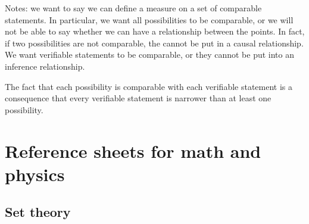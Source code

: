 \documentclass[11pt,letterpaper,fleqn]{memoir} %
\begin{document}
Notes: we want to say we can define a measure on a set of comparable statements. In particular, we want all possibilities to be comparable, or we will not be able to say whether we can have a relationship between the points. In fact, if two possibilities are not comparable, the cannot be put in a causal relationship. We want verifiable statements to be comparable, or they cannot be put into an inference relationship.

The fact that each possibility is comparable with each verifiable statement is a consequence that every verifiable statement is narrower than at least one possibility.





\appendix

\chapter{Reference sheets for math and physics}

\section{Set theory}
\end{document}
